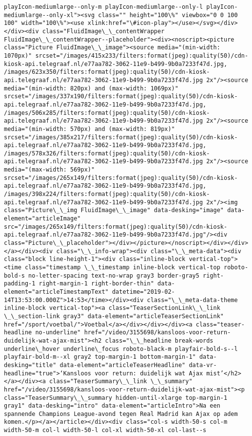 \documentclass[11pt]{article}
\begin{document}
\begin{Verbatim}[commandchars=\\\{\}]
playIcon-mediumlarge--only-m playIcon-mediumlarge--only-l playIcon-mediumlarge--only-xl"><svg class="" height="100\%" viewbox="0 0 100 100" width="100\%"><use xlink:href="\#icon-play"></use></svg></div></div><div class="FluidImage\_\_contentWrapper FluidImage\_\_contentWrapper--placeholder"><div><noscript><picture class="Picture FluidImage\_\_image"><source media="(min-width: 1070px)" srcset="/images/415x233/filters:format(jpeg):quality(50)/cdn-kiosk-api.telegraaf.nl/e77aa782-3062-11e9-b499-9b0a7233f47d.jpg, /images/623x350/filters:format(jpeg):quality(50)/cdn-kiosk-api.telegraaf.nl/e77aa782-3062-11e9-b499-9b0a7233f47d.jpg 2x"/><source media="(min-width: 820px) and (max-width: 1069px)" srcset="/images/337x190/filters:format(jpeg):quality(50)/cdn-kiosk-api.telegraaf.nl/e77aa782-3062-11e9-b499-9b0a7233f47d.jpg, /images/506x285/filters:format(jpeg):quality(50)/cdn-kiosk-api.telegraaf.nl/e77aa782-3062-11e9-b499-9b0a7233f47d.jpg 2x"/><source media="(min-width: 570px) and (max-width: 819px)" srcset="/images/385x217/filters:format(jpeg):quality(50)/cdn-kiosk-api.telegraaf.nl/e77aa782-3062-11e9-b499-9b0a7233f47d.jpg, /images/578x326/filters:format(jpeg):quality(50)/cdn-kiosk-api.telegraaf.nl/e77aa782-3062-11e9-b499-9b0a7233f47d.jpg 2x"/><source media="(max-width: 569px)" srcset="/images/265x149/filters:format(jpeg):quality(50)/cdn-kiosk-api.telegraaf.nl/e77aa782-3062-11e9-b499-9b0a7233f47d.jpg, /images/398x224/filters:format(jpeg):quality(50)/cdn-kiosk-api.telegraaf.nl/e77aa782-3062-11e9-b499-9b0a7233f47d.jpg 2x"/><img class="Picture\_\_img FluidImage\_\_image" data-desking="image" data-element="articleImage" src="/images/265x149/filters:format(jpeg):quality(50)/cdn-kiosk-api.telegraaf.nl/e77aa782-3062-11e9-b499-9b0a7233f47d.jpg"/><div class="Picture\_\_placeholder"></div></picture></noscript></div></div></a></div><div class="\_\_info-wrap"><div class="\_\_meta-data"><div class="block line-height-1"><div class="inline-block vertical-top"><time class="timestamp \_\_timestamp inline-block vertical-top roboto-bold-s no-letter-spacing text-no-wrap gray3 border-gray5 right-padding-1 right-margin-1 right-border-thin" data-element="articleTimestampText" datetime="2019-02-14T13:53:00.000Z">14:53</time></div><div class="\_\_meta-data-theme inline-block vertical-top"><a class="TeaserSectionLink\_\_link \_\_section-link gray3" data-element="articleTeaserSectionLink" href="/sport/voetbal/">Voetbal</a></div></div></div><a class="teaser-headline no-underline" href="/video/3155698/kansloos-voor-return-duidelijk-wat-ajax-mist"><h2 class="\_\_headline break-words underline\_hover underline\_focus roboto-black-m playfair-bold-s--l playfair-bold-m--xl gray2 top-margin-1 bottom-margin-1" data-desking="title" data-element="articleTeaserHeadline" data-vr-headline="true">‘Kansloos voor return: duidelijk wat Ajax mist’</h2></a></div><a class="TeaserSummary\_\_link \_\_summary" href="/video/3155698/kansloos-voor-return-duidelijk-wat-ajax-mist"><p class="TeaserSummary\_\_summary hidden-until-xlarge top-margin-1 gray1" data-desking="intro" data-element="articleIntro">Na een spannende Champions League-avond tegen Real Madrid kan Ajax op adem komen.</p></a></article></div><div class="col-s width-50-s col-m width-50-m col-l width-50-l col-xl width-50-xl col-last--s 
\end{Verbatim}
\end{document}
